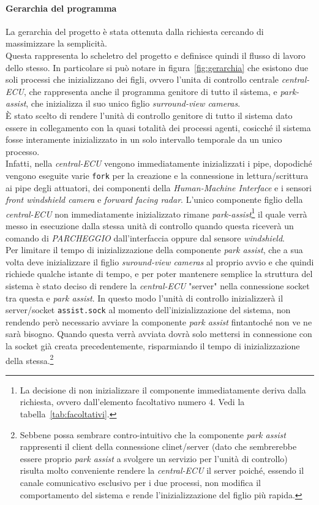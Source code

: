 \documentclass[11pt, openany]{article}
\theoremstyle{definition}
\theoremstyle{plain}
\theoremstyle{remark}
\begin{document}
		\paragraph{Gerarchia del programma}
			La gerarchia del progetto è stata ottenuta dalla richiesta cercando di massimizzare la semplicità.\\
			Questa rappresenta lo scheletro del progetto e definisce quindi il flusso di lavoro dello stesso. In particolare si può notare in figura~\ref{fig:gerarchia} che esistono due soli processi che inizializzano dei figli, ovvero l'unita di controllo centrale \textit{central-ECU}, che rappresenta anche il programma genitore di tutto il sistema, e \textit{park-assist}, che inizializza il suo unico figlio \textit{surround-view cameras}.\\
			È stato scelto di rendere l'unità di controllo genitore di tutto il sistema dato essere in collegamento con la quasi totalità dei processi agenti, cosicché il sistema fosse interamente inizializzato in un solo intervallo temporale da un unico processo.\\
			Infatti, nella \textit{central-ECU} vengono immediatamente inizializzati i pipe, dopodiché vengono eseguite varie \texttt{fork} per la creazione e la connessione in lettura/scrittura ai pipe degli attuatori, dei componenti della \textit{Human-Machine Interface} e i sensori \textit{front windshield camera} e \textit{forward facing radar}. L'unico componente figlio della \textit{central-ECU} non immediatamente inizializzato rimane \textit{park-assist}\footnote{La decisione di non inizializzare il componente immediatamente deriva dalla richiesta, ovvero dall'elemento facoltativo numero 4. Vedi la tabella~\ref{tab:facoltativi}.} il quale verrà messo in esecuzione dalla stessa unità di controllo quando questa riceverà un comando di \textit{PARCHEGGIO} dall'interfaccia oppure dal sensore \textit{windshield}.\\
			Per limitare il tempo di inizializzazione della componente \textit{park assist}, che a sua volta deve inizializzare il figlio \textit{suround-view cameras} al proprio avvio e che quindi richiede qualche istante di tempo, e per poter mantenere semplice la struttura del sistema è stato deciso di rendere la \textit{central-ECU} "server" nella connessione socket tra questa e \textit{park assist}. In questo modo l'unità di controllo inizializzerà il server/socket \texttt{assist.sock} al momento dell'inizializzazione del sistema, non rendendo però necessario avviare la componente \textit{park assist} fintantoché non ve ne sarà bisogno. Quando questa verrà avviata dovrà solo mettersi in connessione con la socket già creata precedentemente, risparmiando il tempo di inizializzazione della stessa.\footnote{Sebbene possa sembrare contro-intuitivo che la componente \textit{park assist} rappresenti il client della connessione clinet/server (dato che sembrerebbe essere proprio \textit{park assist} a svolgere un servizio per l'unità di controllo) risulta molto conveniente rendere la \textit{central-ECU} il server poiché, essendo il canale comunicativo esclusivo per i due processi, non modifica il comportamento del sistema e rende l'inizializzazione del figlio più rapida.}
\end{document}
